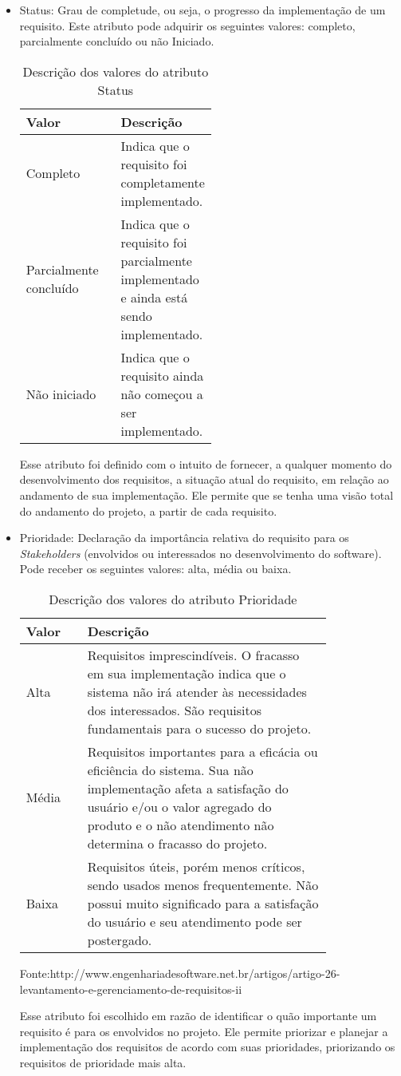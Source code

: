 \begin{itemize}
\item Status:
Grau de completude, ou seja, o progresso da implementação de um requisito. Este atributo pode adquirir os seguintes valores: completo, parcialmente concluído ou não Iniciado.

\begin{table}[h]
\centering
\caption{Descrição dos valores do atributo Status}
\label{Rotulo}
\begin{tabular}{ | l | p{0.5\linewidth} | }
\hline
\textbf{Valor} & \textbf{Descrição} \\ \hline
Completo &  Indica que o requisito foi completamente implementado. \\ \hline
Parcialmente concluído & Indica que o requisito foi parcialmente implementado e ainda está sendo implementado. \\ \hline
Não iniciado & Indica que o requisito ainda não começou a ser implementado. \\ \hline
\end{tabular}
\end{table}

Esse atributo foi definido com o intuito de fornecer, a qualquer momento do desenvolvimento dos requisitos, a situação atual do requisito, em relação ao andamento de sua implementação. Ele permite que se tenha uma visão total do andamento do projeto, a partir de cada requisito.

\item Prioridade:
Declaração da importância relativa do requisito para os \textit{Stakeholders} (envolvidos ou interessados no desenvolvimento do software). Pode receber os seguintes valores: alta, média ou baixa.

\begin{table}[h]
\centering
\caption{Descrição dos valores do atributo Prioridade}
\label{Rotulo}
\begin{tabular}{ | l | p{0.8\linewidth} | }
\hline
\textbf{Valor} & \textbf{Descrição} \\ \hline
Alta &  Requisitos imprescindíveis. O fracasso em sua implementação indica que o sistema não irá atender às necessidades dos interessados. São requisitos fundamentais para o sucesso do projeto. \\ \hline
Média & Requisitos importantes para a eficácia ou eficiência do sistema. Sua não implementação afeta a satisfação do usuário e/ou o valor agregado do produto e o não atendimento não determina o fracasso do projeto. \\ \hline
Baixa & Requisitos úteis, porém menos críticos, sendo usados menos frequentemente. Não possui muito significado para a satisfação do usuário e seu atendimento pode ser postergado. \\ \hline
\end{tabular}
\end{table}
\tiny Fonte:http://www.engenhariadesoftware.net.br/artigos/artigo-26-levantamento-e-gerenciamento-de-requisitos-ii

\normalsize Esse atributo foi escolhido em razão de identificar o quão importante um requisito é para os envolvidos no projeto. Ele permite priorizar e planejar a implementação dos requisitos de acordo com suas prioridades, priorizando os requisitos de prioridade mais alta.


\end{itemize}

